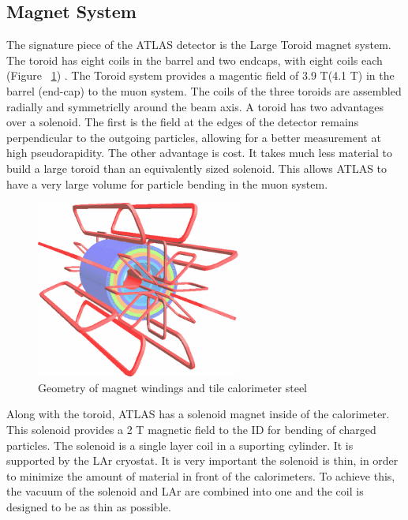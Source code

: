 \subsection{Magnet System}\label{ssec:mag}
The signature piece of the ATLAS detector is the Large Toroid magnet system. The toroid has eight coils in the barrel and two endcaps, with eight coils each (Figure ~\ref{fig:toroid}) \cite{CERN-LHCC-97-018}. The Toroid system provides a magentic field of 3.9 T(4.1 T) in the barrel (end-cap) to the muon system. The coils of the three toroids are assembled radially and symmetriclly around the beam axis. A toroid has two advantages over a solenoid. The first is the field at the edges of the detector remains perpendicular to the outgoing particles, allowing for a better measurement at high pseudorapidity. The other advantage is cost. It takes much less material to build a large toroid than an equivalently sized solenoid. This allows ATLAS to have a very large volume for particle bending in the muon system.\newline

\begin{figure}[h]
\begin{center}
\includegraphics*[width=0.60\textwidth] {figures/toroid}%
\caption[Geometry of magnet windings and tile calorimeter steel]{Geometry of magnet windings and tile calorimeter steel \cite{Love:2011qua}}
\label{fig:toroid}
\end{center}
\end{figure}

\indent Along with the toroid, ATLAS has a solenoid magnet inside of the calorimeter. This solenoid  provides a 2 T magnetic field to the ID for bending of charged particles. The solenoid is a single layer coil in a suporting cylinder. It is supported by the LAr cryostat. It is very important the solenoid is thin, in order to minimize the amount of material in front of the calorimeters. To achieve this, the vacuum of the solenoid and LAr are combined into one and the coil is designed to be as thin as possible.
